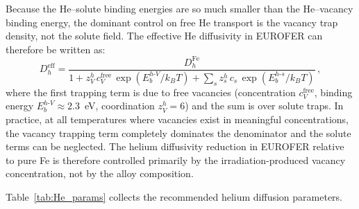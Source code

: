 \documentclass[pdflatex,sn-basic]{sn-jnl} %
\begin{document}
Because the He--solute binding energies are so much smaller than the
He--vacancy binding energy, the dominant control on free He transport is the
vacancy trap density, not the solute field. The effective He diffusivity in
EUROFER can therefore be written as:
\begin{equation}\label{eq:DhEurofer}
    \boxed{D_h^{\mathrm{eff}}
    = \frac{D_h^{\mathrm{Fe}}}
           {1 + z_V^h\,c_V^{\mathrm{free}}\,\exp(E_b^{h\text{-}V}/k_BT)
              + \displaystyle\sum_s z_s^h\,c_s\,\exp(E_b^{h\text{-}s}/k_BT)}\,,}
\end{equation}
where the first trapping term is due to free vacancies (concentration
$c_V^{\mathrm{free}}$, binding energy $E_b^{h\text{-}V} \approx 2.3$~eV,
coordination $z_V^h = 6$) and the sum is over solute traps. In practice, at
all temperatures where vacancies exist in meaningful concentrations, the
vacancy trapping term completely dominates the denominator and the solute
terms can be neglected. The helium diffusivity reduction in EUROFER relative
to pure Fe is therefore controlled primarily by the irradiation-produced
vacancy concentration, not by the alloy composition.

Table~\ref{tab:He_params} collects the recommended helium diffusion parameters.
\end{document}
